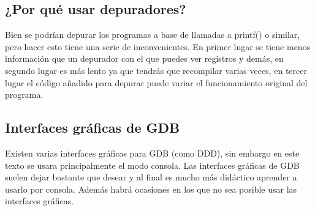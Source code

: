\subsection{¿Por qué usar depuradores?}
Bien se podrían depurar los programas a base de llamadas a printf() o similar, pero hacer esto tiene una serie de inconvenientes. En primer lugar se tiene menos información que un depurador con el que puedes ver registros y demás, en segundo lugar es más lento ya que tendrás que recompilar varias veces, en tercer lugar el código añadido para depurar puede variar el funcionamiento original del programa.

\subsection{Interfaces gráficas de GDB}
Existen varias interfaces gráficas para GDB (como DDD), sin embargo en este texto se usara principalmente el modo consola. Las interfaces gráficas de GDB suelen dejar bastante que desear y al final es mucho más didáctico aprender a usarlo por consola. Además habrá ocasiones en los que no sea posible usar las interfaces gráficas.